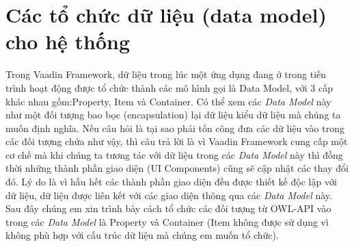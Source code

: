 {\section{Các tổ chức dữ liệu (data model) cho hệ thống}
Trong Vaadin Framework, dữ liệu trong lúc một ứng dụng đang ở trong tiến trình hoạt động được tổ chức thành các mô hình gọi là Data Model, với 3 cấp khác nhau gồm:Property, Item và Container. Có thể xem các \textit{Data Model} này như một đối tượng bao bọc (encapsulation) lại dữ liệu kiểu dữ liệu mà chúng ta muốn định nghĩa. Nếu câu hỏi là tại sao phải tốn công đưa các dữ liệu vào trong các đối tượng chứa như vậy, thì câu trả lời là vì Vaadin Framework cung cấp một cơ chế mà khi chúng ta tương tác với dữ liệu trong các \textit{Data Model} này thì đồng thời những thành phần giao diện (UI Components) cũng sẽ cập nhật các thay đổi đó. Lý do là vì hầu hết các thành phần giao diện đều được thiết kế độc lập với dữ liệu, dữ liệu được liên kết với các giao diện thông qua các \textit{Data Model} này. Sau đây chúng em xin trình bày cách tổ chức các đối tượng từ OWL-API vào trong các \textit{Data Model} là Property và Container (Item không được sử dụng vì không phù hợp với cấu trúc dữ liệu mà chúng em muốn tổ chức).

}
